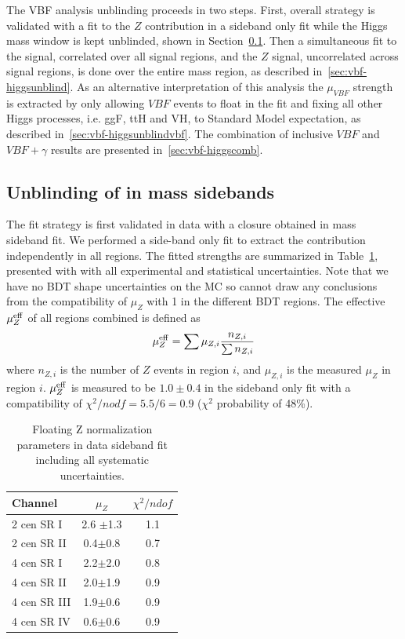 The VBF \Hbb analysis unblinding proceeds in two steps. First, overall strategy is validated with a fit to the $Z$ contribution in a sideband only fit while the Higgs mass window is kept unblinded, shown in Section~\ref{sec:vbf-zunblind}.  Then a simultaneous fit to the signal, correlated over all signal regions, and the $Z$ signal, uncorrelated across signal regions, is done over the entire mass region, as described in~\ref{sec:vbf-higgsunblind}. As an alternative interpretation of this analysis the $\mu_{VBF}$ strength is extracted by only allowing $VBF$ events to float in the fit and fixing all other Higgs processes, i.e. ggF, ttH and VH, to Standard Model expectation, as described in~\ref{sec:vbf-higgsunblindvbf}. The combination of inclusive $VBF$ and $VBF+\gamma$ results are presented in~\ref{sec:vbf-higgscomb}.


\subsection{Unblinding of \zjets{} in mass sidebands}
\label{sec:vbf-zunblind}

The fit strategy is first validated in data with a closure obtained in \zjets{} mass sideband fit. We performed a side-band only fit to extract the \zjets{} contribution independently in all regions. The fitted \zjets{} strengths are summarized in Table~\ref{tab:zsidebandfit}, presented with with all experimental and statistical uncertainties.   Note that we have no BDT shape uncertainties on the \zjets{} MC so cannot draw any conclusions from the compatibility of $\mu_Z$ with 1 in the different BDT regions. The effective $\mu_{Z}^{\rm eff}$ of all regions combined is defined as
\begin{equation}
\label{eqn:zsig}
\mu_{Z}^{\rm eff} = \sum \mu_{Z,i}\frac{n_{Z,i}}{\sum n_{Z,i}} 
\end{equation}
where $n_{Z,i}$ is the number of $Z$ events in region $i$, and $\mu_{Z,i}$ is the measured $\mu_Z$ in region $i$.  $\mu_{Z}^{\rm eff}$ is measured to be $1.0\pm 0.4$ in the sideband only fit with a compatibility of $\chi^2/nodf = 5.5/6=0.9$ ($\chi^2$ probability of 48\%).


\begin{table}[htbp]
\centering
\caption{Floating Z normalization parameters in data sideband fit including all systematic uncertainties.}
\label{tab:zsidebandfit}
\begin{tabular}{|l|c|c|}
\hline
Channel      & $\mu_{Z}$   & $\chi^2/ndof$ \\ \hline
2 cen SR I   & 2.6 $\pm$1.3  & 1.1          \\ \hline
2 cen SR II  & 0.4$\pm$0.8  & 0.7          \\ \hline
4 cen SR I   & 2.2$\pm$2.0  & 0.8          \\ \hline
4 cen SR II  & 2.0$\pm$1.9  & 0.9          \\ \hline
4 cen SR III & 1.9$\pm$0.6  & 0.9          \\ \hline
4 cen SR IV  & 0.6$\pm$0.6  & 0.9          \\ \hline
\end{tabular}
\end{table}



